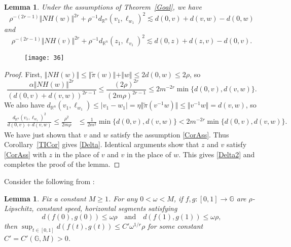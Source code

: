 \documentclass[11pt]{amsart}
\newtheorem{lemma}[theorem]{Lemma}
\theoremstyle{definition}
\numberwithin{theorem}{section} \numberwithin{equation}{section}
\begin{document}
\begin{lemma}
Under the assumptions of Theorem~\ref{Goal}, we have
\begin{equation}
\label{Delta}
\rho^{-(2r-1)} \Vert NH(w) \Vert^{2r} + \rho^{-1} d_{\mathbb{R}^n}(v_1,\ell_{w_1})^2 \lesssim d(0,v) + d(v,w) - d(0,w)
\end{equation}
and
\begin{equation}
\label{Delta2}
\rho^{-(2r-1)} \Vert NH(v) \Vert^{2r} + \rho^{-1} d_{\mathbb{R}^n}(z_1,\ell_{v_1})^2 \lesssim d(0,z) + d(z,v) - d(0,v).
\end{equation}
\end{lemma}
\begin{figure}[H]
\centering
\texttt{[image: 36]}
\caption{}
\label{fig1}
\end{figure}
\begin{proof}
First, 
$\Vert NH(w) \Vert \leq \Vert \tilde{\pi}(w) \Vert + \Vert w \Vert \leq 2d(0,w) \leq 2\rho$, so 
$$
\frac{\alpha \left\Vert NH\left( w \right) \right\Vert^{2r}}{(d(0,v) + d(v,w))^{2r-1}}
\leq \frac{ (2\rho)^{2r}}{(2m\rho)^{2r-1}} 
\leq  2 m^{-2r} \min \{ d(0,v), d(v,w) \}.
$$
We also
have
$d_{\mathbb{R}^n}(v_1,\ell_{w_1}) \leq |v_1 - w_1| = \eta \Vert \tilde{\pi}(v^{-1}w) \Vert \leq \Vert v^{-1}w \Vert = d(v,w)$, so
\begin{align*}
\frac{d_{\mathbb{R}^n}(v_1,\ell_{w_1})^2}{d(0,v) + d(v,w)}
\leq \frac{ \rho^2}{2m\rho} 
&\leq  \frac{1}{2m^2} \min \{ d(0,v), d(v,w) \} 
< 2 m^{-2r} \min \{ d(0,v), d(v,w) \} .
\end{align*}
We have just shown that $v$ and $w$ satisfy the assumption \eqref{CorAss}.
Thus Corollary~\ref{TICor} gives \eqref{Delta}.
Identical arguments show that $z$ and $v$ satisfy \eqref{CorAss}
with $z$ in the place of $v$ and $v$ in the place of $w$.
This gives \eqref{Delta2} and completes the proof of the lemma.
\end{proof}



Consider the following from \cite[Lemma~3.8]{LiThesis}:
\begin{lemma}
\label{SegLem}
Fix a constant $M \geq 1$.
For any $0 < \omega < M$,
if $f,g:[0,1] \to \mathbb{G}$
are $\rho$-Lipschitz, constant speed, horizontal segments satisfying
$$
d(f(0),g(0)) \leq \omega \rho \quad \text{and} \quad d(f(1),g(1)) \leq \omega \rho,
$$
then $\sup_{t \in [0,1]} d(f(t),g(t)) \leq C' \omega^{1/r} \rho$
for some constant $C'=C'(\mathbb{G},M)>0$.
\end{lemma}
\end{document}
